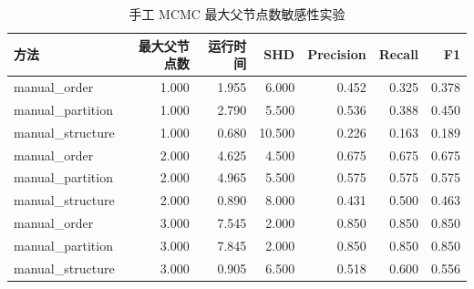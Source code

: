 \begin{table}[H]
\centering
\small
\setlength{\tabcolsep}{2pt}
\caption{手工 MCMC 最大父节点数敏感性实验}
\label{tab:manual_sensitivity}
\begin{tabular}{lrrrrrr}
\toprule
方法 & 最大父节点数 & 运行时间 & SHD & Precision & Recall & F1
\\
\midrule
manual\_order & 1.000 & 1.955 & 6.000 & 0.452 & 0.325 & 0.378 \\
manual\_partition & 1.000 & 2.790 & 5.500 & 0.536 & 0.388 & 0.450 \\
manual\_structure & 1.000 & 0.680 & 10.500 & 0.226 & 0.163 & 0.189 \\
manual\_order & 2.000 & 4.625 & 4.500 & 0.675 & 0.675 & 0.675 \\
manual\_partition & 2.000 & 4.965 & 5.500 & 0.575 & 0.575 & 0.575 \\
manual\_structure & 2.000 & 0.890 & 8.000 & 0.431 & 0.500 & 0.463 \\
manual\_order & 3.000 & 7.545 & 2.000 & 0.850 & 0.850 & 0.850 \\
manual\_partition & 3.000 & 7.845 & 2.000 & 0.850 & 0.850 & 0.850 \\
manual\_structure & 3.000 & 0.905 & 6.500 & 0.518 & 0.600 & 0.556 \\
\bottomrule
\end{tabular}
\end{table}
